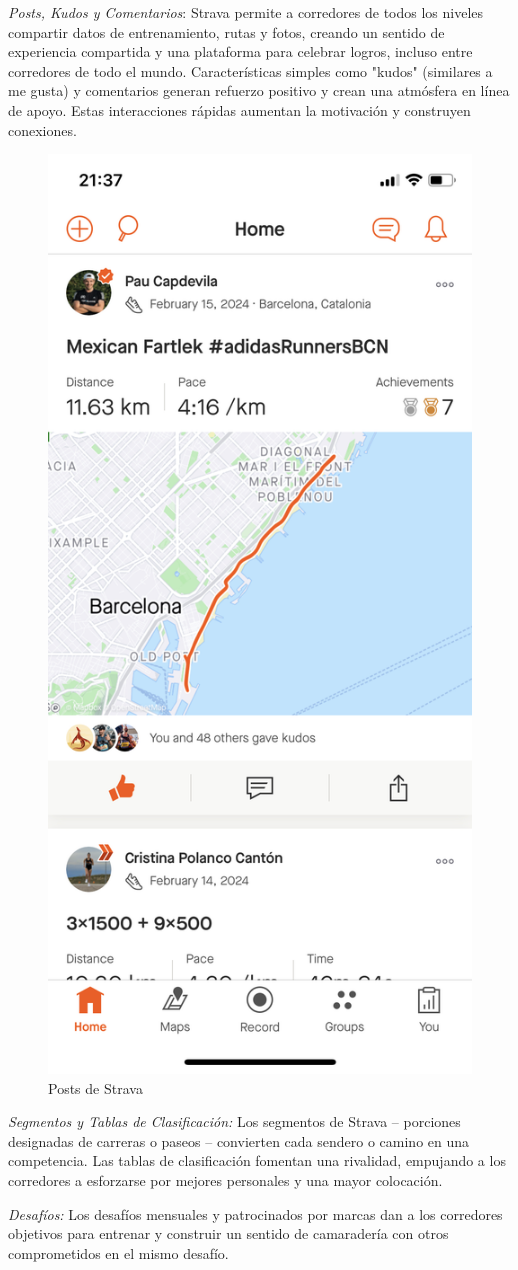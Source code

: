 \begin{itemize}
\textit{Posts, Kudos y Comentarios}: Strava permite a corredores de todos los niveles compartir datos de entrenamiento, 
rutas y fotos, creando un sentido de experiencia compartida y una plataforma para celebrar logros, incluso entre corredores de 
todo el mundo. Características simples como "kudos" (similares a me gusta) y comentarios generan refuerzo positivo y crean una 
atmósfera en línea de apoyo. Estas interacciones rápidas aumentan la motivación y construyen conexiones.

\begin{figure}[H]
  \centering
  \includegraphics[cframe=black 2pt,width=0.3\linewidth]{images/estadodelarte/stravaposts.jpeg}
  \caption{Posts de Strava}
  \label{fig:strava_posts}
\end{figure}


\textit{Segmentos y Tablas de Clasificación:} Los segmentos de Strava – porciones designadas de carreras o paseos – convierten cada 
sendero o camino en una competencia. Las tablas de clasificación fomentan una rivalidad, empujando a los corredores a esforzarse por mejores personales y una mayor colocación.

\textit{Desafíos:} Los desafíos mensuales y patrocinados por marcas dan a los corredores objetivos para entrenar y construir un 
sentido de camaradería con otros comprometidos en el mismo desafío.


\end{itemize}
